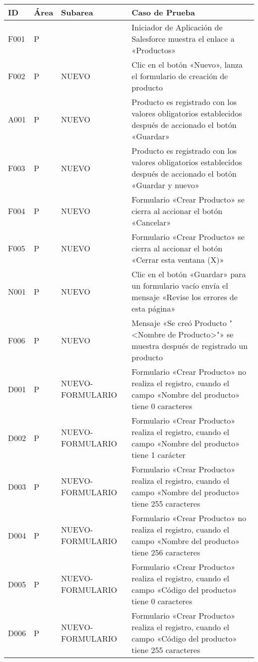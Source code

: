 \begin{landscape}
\centering
\small
\begin{longtable}[htb]{|l|l|p{5.0cm}|p{13.0cm}|}
\hline
\textbf{ID} & \textbf{Área} & \textbf{Subarea} & \textbf{Caso de Prueba} \\
\hline
F001 & P &  & Iniciador de Aplicación de Salesforce muestra el enlace a «Productos» \\ \hline
F002 & P & NUEVO & Clic en el botón «Nuevo», lanza el formulario de creación de producto \\ \hline
A001 & P & NUEVO & Producto es registrado con los valores obligatorios establecidos después de accionado el botón «Guardar» \\ \hline
F003 & P & NUEVO & Producto es registrado con los valores obligatorios establecidos después de accionado el botón «Guardar y nuevo» \\ \hline
F004 & P & NUEVO & Formulario «Crear Producto» se cierra al accionar el botón «Cancelar» \\ \hline
F005 & P & NUEVO & Formulario «Crear Producto» se cierra al accionar el botón «Cerrar esta ventana (X)» \\ \hline
N001 & P & NUEVO & Clic en el botón «Guardar» para un formulario vacío envía el mensaje «Revise los errores de esta página» \\ \hline
F006 & P & NUEVO & Mensaje «Se creó Producto "<Nombre de Producto>"» se muestra después de registrado un producto \\ \hline
D001 & P & NUEVO-FORMULARIO & Formulario «Crear Producto» no realiza el registro, cuando el campo «Nombre del producto» tiene 0 caracteres \\ \hline
D002 & P & NUEVO-FORMULARIO & Formulario «Crear Producto» realiza el registro, cuando el campo «Nombre del producto» tiene 1 carácter \\ \hline
D003 & P & NUEVO-FORMULARIO & Formulario «Crear Producto» realiza el registro, cuando el campo «Nombre del producto» tiene 255 caracteres \\ \hline
D004 & P & NUEVO-FORMULARIO & Formulario «Crear Producto» no realiza el registro, cuando el campo «Nombre del producto» tiene 256 caracteres \\ \hline
D005 & P & NUEVO-FORMULARIO & Formulario «Crear Producto» realiza el registro, cuando el campo «Código del producto» tiene 0 caracteres \\ \hline
D006 & P & NUEVO-FORMULARIO & Formulario «Crear Producto» realiza el registro, cuando el campo «Código del producto» tiene 255 caracteres \\ \hline

\end{longtable}
\end{landscape}
